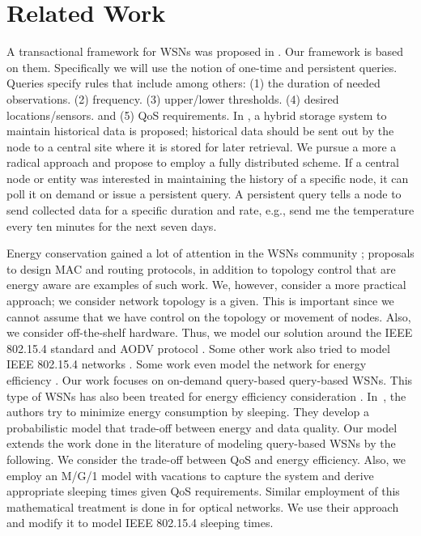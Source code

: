 \section{Related Work} \label{sec:relwork}

A transactional framework for WSNs was proposed in \cite{2, 24}. Our framework is based on them. Specifically we will use the notion of one-time and persistent queries. Queries specify rules that include among others: (1) the duration of needed observations. (2) frequency. (3) upper/lower thresholds. (4) desired locations/sensors. and (5) QoS requirements. In \cite{2}, a hybrid storage system to maintain historical data is proposed; historical data should be sent out by the node to a central site where it is stored for later retrieval. We pursue a more a radical approach and propose to employ a fully distributed scheme. If a central node or entity was interested in maintaining the history of a specific node, it can poll it on demand or issue a persistent query. A persistent query tells a node to send collected data for a specific duration and rate, e.g., send me the temperature every ten minutes for the next seven days.

Energy conservation gained a lot of attention in the WSNs community \cite{1,5,6,7}; proposals to design MAC and routing protocols, in addition to topology control that are energy aware are examples of such work. We, however, consider a more practical approach; we consider network topology is a given. This is important since we cannot assume that we have control on the topology or movement of nodes. Also, we consider off-the-shelf hardware. Thus, we model our solution around the IEEE 802.15.4 standard and AODV protocol \cite{aodv}. Some other work also tried to model IEEE 802.15.4 networks \cite{8,9,10,4.11,12,13}. Some work even model the network for energy efficiency \cite{10,12,13}. Our work focuses on on-demand query-based query-based WSNs. This type of WSNs has also been treated for energy efficiency consideration \cite{14,25}. In~\cite{25}, the authors try to minimize energy consumption by sleeping. They develop a probabilistic model that trade-off between energy and data quality. Our model extends the work done in the literature of modeling query-based WSNs by the following. We consider the trade-off between QoS and energy efficiency. Also, we employ an M/G/1 model with vacations to capture the system and derive appropriate sleeping times given QoS requirements. Similar employment of this mathematical treatment is done in \cite{15} for optical networks. We use their approach and modify it to model IEEE 802.15.4 sleeping times.
